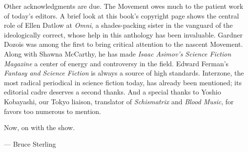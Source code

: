 Other acknowledgments are due. The Movement owes much to the patient work of today's editors. A brief look at this book's copyright page shows the central role of Ellen Datlow at \textit{Omni}, a shades-packing sister in the vanguard of the ideologically correct, whose help in this anthology has been invaluable. Gardner Dozois was among the first to bring critical attention to the nascent Movement. Along with Shawna McCarthy, he has made \textit{Isaac Asimov's Science Fiction Magazine} a center of energy and controversy in the field. Edward Ferman's \textit{Fantasy and Science Fiction} is always a source of high standards. Interzone, the most radical periodical in science fiction today, has already been mentioned; its editorial cadre deserves a second thanks. And a special thanks to Yoshio Kobayashi, our Tokyo liaison, translator of \textit{Schismatrix} and \textit{Blood Music}, for favors too numerous to mention.

Now, on with the show.

--- Bruce Sterling
